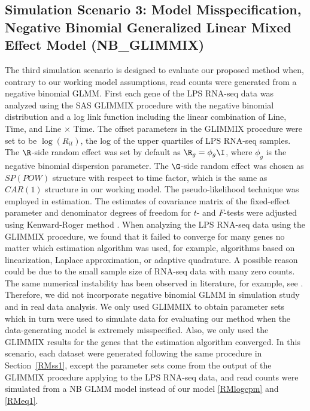 \subsection{Simulation Scenario 3: Model Misspecification, Negative Binomial Generalized Linear Mixed Effect Model (NB\_GLIMMIX)}\label{RMss3}
The third simulation scenario is designed to evaluate our proposed method when, contrary to our working model assumptions, read counts were generated from a negative binomial GLMM. First each gene of the LPS RNA-seq data was analyzed using the SAS  GLIMMIX procedure with the negative binomial distribution and a log link function including the linear  combination of Line, Time, and Line $\times$ Time. The offset parameters in the GLIMMIX procedure were set to be $\log(R_{it})$, the log of the upper quartiles of LPS RNA-seq samples. The $\R$-side random effect was set by default as $\R_g = \phi_g \I$, where $\phi_g$ is the negative binomial dispersion parameter. The $\G$-side random effect was chosen as $SP(POW)$ structure with respect to time factor, which is the same as $CAR(1)$ structure in our working model. The pseudo-likelihood technique \citep{wolfinger1993,breslow1993} was employed in estimation.  The estimates of covariance matrix of the fixed-effect parameter  and denominator degrees of freedom for $t$- and $F$-tests were adjusted using Kenward-Roger method \citep{kenward1997}. When analyzing the LPS RNA-seq data using the GLIMMIX procedure, we found that it failed to converge for many genes no matter which estimation  algorithm  was used, for example, algorithms based on linearization,  Laplace approximation, or adaptive quadrature. A possible reason could be due to the small sample size of RNA-seq data with many zero counts. The same numerical instability has been observed in literature, for example, see \citet{cui2016}. Therefore, we did not incorporate negative binomial GLMM in simulation study and in real data analysis. We only used GLIMMIX to obtain parameter sets which in turn were used to simulate data for evaluating our method when the data-generating model is extremely misspecified.  Also, we only used the  GLIMMIX results for the genes that the estimation algorithm converged. In this  scenario, each dataset were generated following the same procedure in Section~\ref{RMss1}, except the parameter sets come from the output of the GLIMMIX procedure applying to the LPS RNA-seq data, and read counts were simulated from a NB GLMM model instead of our model \eqref{RMlogcpm} and \eqref{RMeq1}.


